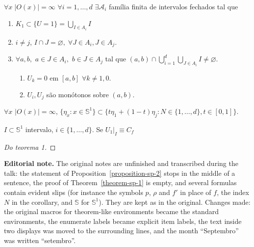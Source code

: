 \begin{theorem}[Teorema 1]
\label{theorem-sp-1}
$\forall x\; |O(x)|= \infty$
$\forall i=1,\ldots,d$ $ \exists
\mathcal{A}_{i}$ família finita de
intervalos fechados tal que
\begin{enumerate}
\item $K_1\subset \{U=1\} =
\bigcup_{I\in A_i}I $

\item $i\neq j$,
$I\cap J=\varnothing,\;\forall J\in A_i,
J\in A_j$.

\item $\forall a,b,$ $a\in J\in A_i,$
$b \in J\in A_j$ tal que
$(a,b)\cap \bigcup_{i=1} ^d
\bigcup_{J\in A_i} I\neq \varnothing$.
\begin{enumerate}
\item[(i)] $U_k=0$ em $[a,b]$
$\forall k\neq 1,0$.
\item[(ii)] $U_i,U_j$ são monótonos sobre
$(a,b)$.
\end{enumerate}
\end{enumerate}
\end{theorem}

\begin{corollary}
\label{corollary-sp-orbit}
$\forall x$ $|O(x)| =\infty$,
$\{\eta_x:x\in\mathbb{S}^1\} \subset
\{t\eta_1+(1-t)\eta_j:N\in\{1,\ldots,d\},
t\in [0,1]\}$.
\end{corollary}

\begin{proposition}[Proposição 2]
\label{proposition-sp-2}
$I\subset \mathbb{S}^1$ intervalo,
$i\in\{1,\ldots,d\}$.
Se $U_1|_{I}\equiv C_f$
\end{proposition}

\begin{proof}[Do teorema 1]

\end{proof}

\medskip\noindent
{\bf Editorial note.}
The original notes are unfinished and
transcribed during the talk: the statement of
Proposition~\ref{proposition-sp-2}
stops in the middle of a sentence, the proof
of Theorem~\ref{theorem-sp-1} is empty, and
several formulas contain evident slips
(for instance the symbols $p$, $\rho$
and $f'$ in place of $f$, the index $N$ in
the corollary, and $\mathbb{S}$ for
$\mathbb{S}^1$). They are kept as in the
original. Changes made: the original
macros for theorem-like environments became
the standard environments, the enumerate
labels became explicit item labels, the
text inside two displays was moved to the
surrounding lines, and the month
``Septembro'' was written ``setembro''.

